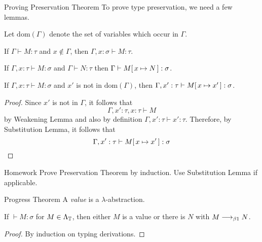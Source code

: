 \begin{frame}[allowframebreaks]{Proving Preservation Theorem}
  To prove type preservation, we need a few lemmas. 

  Let $\mathrm{dom}(\Gamma)$ denote the set of variables which occur in
  $\Gamma$. 
  \begin{lemma}[Weakening]
    If $\Gamma \vdash M : \tau$ and $x \not\in \Gamma$, then 
    $\Gamma, x : \sigma \vdash M : \tau$. 
  \end{lemma}
  \begin{lemma}[Substitution]
    If $\Gamma, x : \tau \vdash M : \sigma$ and $\Gamma \vdash N : \tau$ then
    $\Gamma \vdash M[\,x\mapsto N\,] : \sigma$.
    
  \end{lemma}

  \begin{corollary}
    If $\Gamma, x : \tau \vdash M :\sigma$ and $x'$ is not in
    $\mathrm{dom}(\Gamma)$, then $ \Gamma, x' : \tau \vdash M[\,x\mapsto x'\,] :
    \sigma$. 
  \end{corollary}
  \framebreak
  \begin{proof}
    Since $x'$ is not in $\Gamma$, it follows that 
    \[
      \Gamma, x' : \tau, x : \tau \vdash M 
    \]
    by Weakening Lemma and also by definition $\Gamma, x' : \tau \vdash x' :
    \tau$.
    Therefore, by Substitution Lemma, it follows that
    \[
      \Gamma, x' : \tau \vdash M[\,x\mapsto x'\,] : \sigma
    \]
  \end{proof}
  \begin{block}{Homework}
    Prove Preservation Theorem by induction.  Use Substitution Lemma if
    applicable. 
  \end{block}
\end{frame}

\begin{frame}{Progress Theorem}
  A \emph{value} is a $\lambda$-abstraction. 
\begin{theorem}
  If ${}\vdash M : \sigma$ for $M \in \Lambda_{\mathbb{T}}$, then either $M$ is a value or
  there is $N$ with $M \longrightarrow_{\beta1} N$.
\end{theorem}
\begin{proof}
  By induction on typing derivations. 
\end{proof}
\end{frame}

